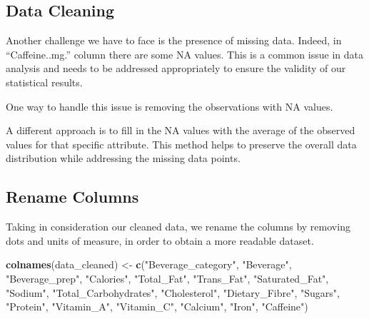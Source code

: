 \documentclass[
]{article}
\newenvironment{Shaded}{\begin{snugshade}}{\end{snugshade}}
\newcommand{\FunctionTok}[1]{\textcolor[rgb]{0.13,0.29,0.53}{\textbf{#1}}}
\newcommand{\NormalTok}[1]{#1}
\newcommand{\OtherTok}[1]{\textcolor[rgb]{0.56,0.35,0.01}{#1}}
\newcommand{\SpecialCharTok}[1]{\textcolor[rgb]{0.81,0.36,0.00}{\textbf{#1}}}
\newcommand{\StringTok}[1]{\textcolor[rgb]{0.31,0.60,0.02}{#1}}
\begin{document}
\hypertarget{data-cleaning}{%
\subsection{Data Cleaning}\label{data-cleaning}}

Another challenge we have to face is the presence of missing data.
Indeed, in ``Caffeine..mg.'' column there are some NA values. This is a
common issue in data analysis and needs to be addressed appropriately to
ensure the validity of our statistical results.

One way to handle this issue is removing the observations with NA
values.

A different approach is to fill in the NA values with the average of the
observed values for that specific attribute. This method helps to
preserve the overall data distribution while addressing the missing data
points.

\begin{Shaded}
\end{Shaded}

\hypertarget{rename-columns}{%
\subsection{Rename Columns}\label{rename-columns}}

Taking in consideration our cleaned data, we rename the columns by
removing dots and units of measure, in order to obtain a more readable
dataset.

\begin{Shaded}
\begin{Highlighting}[]
\FunctionTok{colnames}\NormalTok{(data\_cleaned) }\OtherTok{\textless{}{-}} \FunctionTok{c}\NormalTok{(}\StringTok{"Beverage\_category"}\NormalTok{, }\StringTok{"Beverage"}\NormalTok{,}
                            \StringTok{"Beverage\_prep"}\NormalTok{, }\StringTok{"Calories"}\NormalTok{,}
                            \StringTok{"Total\_Fat"}\NormalTok{, }\StringTok{"Trans\_Fat"}\NormalTok{,}
                            \StringTok{"Saturated\_Fat"}\NormalTok{, }\StringTok{"Sodium"}\NormalTok{,}
                            \StringTok{"Total\_Carbohydrates"}\NormalTok{, }\StringTok{"Cholesterol"}\NormalTok{,}
                            \StringTok{"Dietary\_Fibre"}\NormalTok{, }\StringTok{"Sugars"}\NormalTok{,}
                            \StringTok{"Protein"}\NormalTok{, }\StringTok{"Vitamin\_A"}\NormalTok{,}
                            \StringTok{"Vitamin\_C"}\NormalTok{, }\StringTok{"Calcium"}\NormalTok{,}
                            \StringTok{"Iron"}\NormalTok{, }\StringTok{"Caffeine"}\NormalTok{)}
\end{Highlighting}
\end{Shaded}
\end{document}
